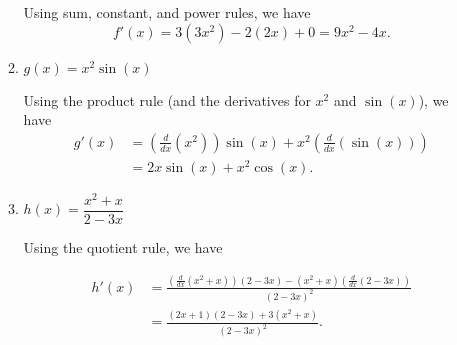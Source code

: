 \documentclass[12pt]{article}
\begin{document}
\begin{enumerate}
\begin{enumerate}
\bigskip

Using sum, constant, and power rules, we have
\[
 f'(x) = 3(3x^2)-2(2x)+0 = 9x^2-4x.
\]


 \item $g(x) = x^2\sin(x)$

\bigskip

Using the product rule (and the derivatives for $x^2$ and $\sin(x)$), we have
\begin{align*}
 g'(x) & = \left(\frac{d}{dx}(x^2)\right)\sin(x)+x^2\left(\frac{d}{dx}(\sin(x))\right)\\
  & = 2x\sin(x)+x^2\cos(x).
\end{align*}



 \item $h(x) = \dfrac{x^2+x}{2-3x}$

\bigskip

Using the quotient rule, we have

\begin{align*}
 h'(x) & = \frac{\left(\frac{d}{dx}(x^2+x)\right)(2-3x)-(x^2+x)\left(\frac{d}{dx}(2-3x)\right)}{(2-3x)^2}\\
 & = \frac{(2x+1)(2-3x)+3(x^2+x)}{(2-3x)^2}.
\end{align*}

\end{enumerate}
\end{enumerate}
\
\end{document}
